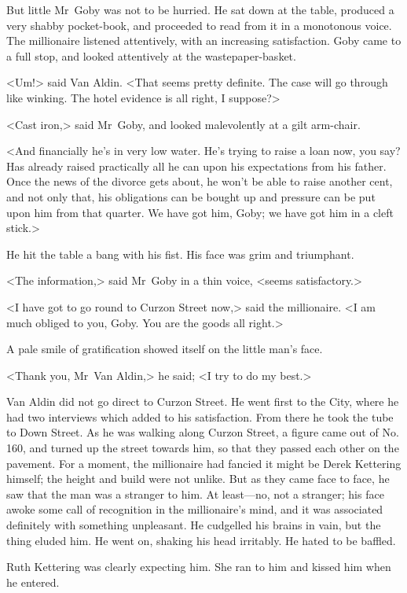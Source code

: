 But little Mr~Goby was not to be hurried. He sat down at the table, produced a very shabby pocket-book, and proceeded to read from it in a monotonous voice. The millionaire listened attentively, with an increasing satisfaction. Goby came to a full stop, and looked attentively at the wastepaper-basket.

<Um!> said Van Aldin. <That seems pretty definite. The case will go through like winking. The hotel evidence is all right, I suppose?>

<Cast iron,> said Mr~Goby, and looked malevolently at a gilt arm-chair.

<And financially he's in very low water. He's trying to raise a loan now, you say? Has already raised practically all he can upon his expectations from his father. Once the news of the divorce gets about, he won't be able to raise another cent, and not only that, his obligations can be bought up and pressure can be put upon him from that quarter. We have got him, Goby; we have got him in a cleft stick.>

He hit the table a bang with his fist. His face was grim and triumphant.

<The information,> said Mr~Goby in a thin voice, <seems satisfactory.>

<I have got to go round to Curzon Street now,> said the millionaire. <I am much obliged to you, Goby. You are the goods all right.>

A pale smile of gratification showed itself on the little man's face.

<Thank you, Mr~Van Aldin,> he said; <I try to do my best.>

Van Aldin did not go direct to Curzon Street. He went first to the City, where he had two interviews which added to his satisfaction. From there he took the tube to Down Street. As he was walking along Curzon Street, a figure came out of No. 160, and turned up the street towards him, so that they passed each other on the pavement. For a moment, the millionaire had fancied it might be Derek Kettering himself; the height and build were not unlike. But as they came face to face, he saw that the man was a stranger to him. At least—no, not a stranger; his face awoke some call of recognition in the millionaire's mind, and it was associated definitely with something unpleasant. He cudgelled his brains in vain, but the thing eluded him. He went on, shaking his head irritably. He hated to be baffled.

Ruth Kettering was clearly expecting him. She ran to him and kissed him when he entered.


